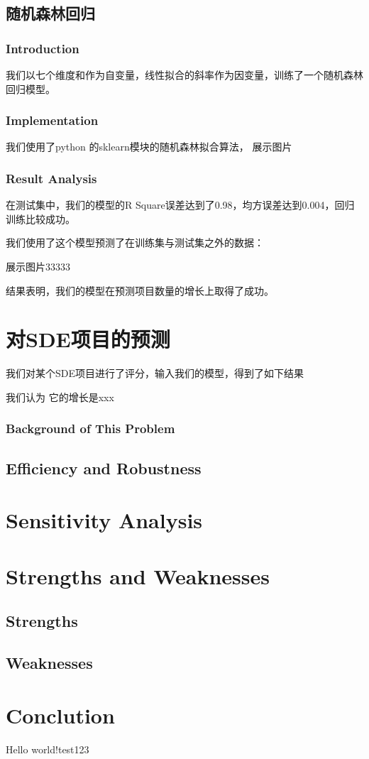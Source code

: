 \documentclass[a4paper]{article}
\begin{document}
\subsection{随机森林回归}
\subsubsection{Introduction}

我们以七个维度和作为自变量，线性拟合的斜率作为因变量，训练了一个随机森林回归模型。

\subsubsection{Implementation}
我们使用了python 的sklearn模块的随机森林拟合算法，
展示图片


\subsubsection{Result Analysis}
在测试集中，我们的模型的R Square误差达到了0.98，均方误差达到0.004，回归训练比较成功。

我们使用了这个模型预测了在训练集与测试集之外的数据：

展示图片33333

结果表明，我们的模型在预测项目数量的增长上取得了成功。



\section{对SDE项目的预测}
我们对某个SDE项目进行了评分，输入我们的模型，得到了如下结果

我们认为 它的增长是xxx
\subsubsection{Background of This Problem}
\subsection{Efficiency and Robustness}
\section{Sensitivity Analysis}
\section{Strengths and Weaknesses}
\subsection{Strengths}
\subsection{Weaknesses}
\section{Conclution}
Hello world!test123
\end{document}
